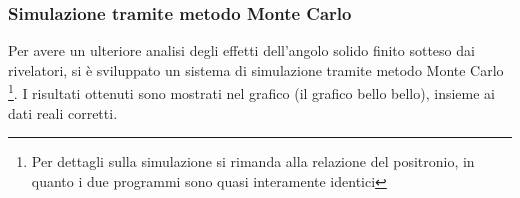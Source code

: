 \subsubsection{Simulazione tramite metodo Monte Carlo}

Per avere un ulteriore analisi degli effetti dell'angolo solido finito sotteso dai rivelatori, si è sviluppato un sistema di simulazione tramite metodo Monte Carlo \footnote{Per dettagli sulla simulazione si rimanda alla relazione del positronio, in quanto i due programmi sono quasi interamente identici}. I risultati ottenuti sono mostrati nel grafico (il grafico bello bello), insieme ai dati reali corretti.
